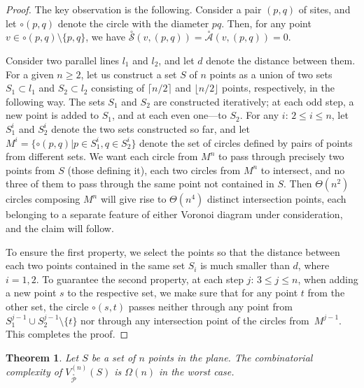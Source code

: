 \documentclass[10pt, conference, compsocconf]{IEEEtran}
\newtheorem{theorem}{Theorem}
\def\XA{{\stackrel{\circ}{\mathcal A}}}
\def\XP{{\stackrel{\circ}{\mathcal P}}}
\def\XS{{\stackrel{\circ}{\mathcal S}}}
\begin{document}
\begin{proof}
   The key observation is the following.  Consider a pair $(p,q)$ of sites,
   and let $\circ(p,q)$ denote the circle with the diameter $pq$.  Then, for
   any point $v \in \circ(p,q) \setminus \{p,q\}$, we have
   $\XS(v,(p,q)) = \XA(v,(p,q)) = 0$.

   Consider two parallel lines $l_1$ and $l_2$, and let $d$ denote the
   distance between them.  For a given $n\ge 2$, let us construct a set $S$
   of $n$ points as a union of two sets $S_1\subset l_1$ and $S_2\subset l_2$
   consisting of $\lceil n/2\rceil$ and $\lfloor n/2 \rfloor$ points,
   respectively, in the following way.  The sets $S_1$ and $S_2$ are
   constructed iteratively; at each odd step, a new point is added to $S_1$,
   and at each even one---to $S_2$.  For any $i$: $2\le i\le n$, let $S_1^i$
   and $S_2^i$ denote the two sets constructed so far, and let
   $M^i=\{\circ(p,q) | p\in S_1^i, q\in S_2^i\}$ denote the set of circles
   defined by pairs of points from different sets.
   We want each circle from $M^n$ to pass through precisely two points from $S$ (those defining it), each two circles from $M^n$ to intersect, and no three of them to
   pass through the same point not contained in $S$. Then $\Theta(n^2)$ circles composing $M^n$
   will give rise to $\Theta(n^4)$ distinct intersection points, each
   belonging to a separate feature of either Voronoi diagram under
   consideration, and the claim will follow.

   To ensure the first property, we select the points so that the distance
   between each two points contained in the same set $S_i$ is much smaller
   than $d$, where $i=1,2$. To guarantee the second property, at each step
   $j$: $3\le j\le n$, when adding a new point $s$ to the respective set,
   we make sure that for any point $t$ from the other set, the circle
   $\circ(s,t)$ passes neither through any point from $S_1^{j-1}\cup S_2^{j-1}\setminus \{t\}$ nor through any intersection point of the
   circles from~$M^{j-1}$.
   This completes the proof.
\end{proof}

\begin{theorem}
   Let $S$ be a set of $n$ points in the plane.
   The combinatorial complexity of $V_\XP^{(n)}(S)$ is $\Omega(n)$ in the
   worst case.
\end{theorem}
\end{document}
